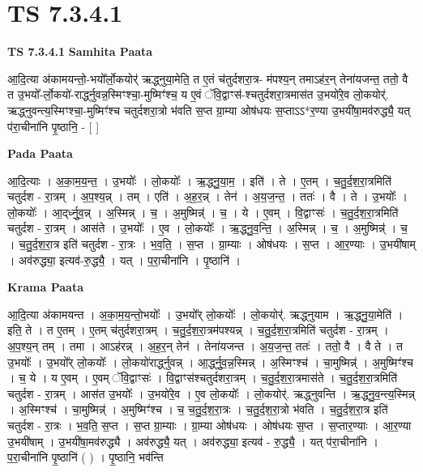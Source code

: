 \documentclass[17pt]{extarticle}
\begin{document}
\section{ TS 7.3.4.1 }

\textbf{TS 7.3.4.1 } \newline
\textbf{Samhita Paata} \newline

आ॒दि॒त्या अ॑कामयन्तो॒-भयो᳚र्लो॒कयोर्॑ ऋद्ध्नुया॒मेति॒ त ए॒तं च॑तुर्दशरा॒त्र- म॑पश्य॒न् तमाऽह॑र॒न् तेना॑यजन्त॒ ततो॒ वै त उ॒भयो᳚-र्लो॒कयो॑-रार्द्ध्नुवन्न॒स्मिꣳश्चा॒-मुष्मिꣳ॑श्च॒ य ए॒वं ॅवि॒द्वाꣳस॑-श्चतुर्दशरा॒त्रमास॑त उ॒भयो॑रे॒व लो॒कयोर्॑. ऋद्ध्नुवन्त्य॒स्मिꣳश्चा॒-मुष्मिꣳ॑श्च चतुर्दशरा॒त्रो भ॑वति स॒प्त ग्रा॒म्या ओष॑धयः स॒प्ताऽऽ*र॒ण्या उ॒भयी॑षा॒मव॑रुद्ध्यै॒ यत् प॑रा॒चीना॑नि पृ॒ष्ठानि॒ - [  ] \newline

\textbf{Pada Paata} \newline

आ॒दि॒त्याः । अ॒का॒म॒य॒न्त॒ । उ॒भयोः᳚ । लो॒कयोः᳚ । ऋ॒द्ध्नु॒या॒म॒ । इति॑ । ते । ए॒तम् । च॒तु॒र्द॒श॒रा॒त्रमिति॑ चतुर्दश - रा॒त्रम् । अ॒प॒श्य॒न्न् । तम् । एति॑ । अ॒ह॒र॒न्न् । तेन॑ । अ॒य॒ज॒न्त॒ । ततः॑ । वै । ते । उ॒भयोः᳚ । लो॒कयोः᳚ । आ॒द्‌र्ध्नु॒व॒न्न् । अ॒स्मिन्न् । च॒ । अ॒मुष्मिन्न्॑ । च॒ । ये । ए॒वम् । वि॒द्वाꣳसः॑ । च॒तु॒र्द॒श॒रा॒त्रमिति॑ चतुर्दश - रा॒त्रम् । आस॑ते । उ॒भयोः᳚ । ए॒व । लो॒कयोः᳚ । ऋ॒द्ध्नु॒व॒न्ति॒ । अ॒स्मिन्न् । च॒ । अ॒मुष्मिन्न्॑ । च॒ । च॒तु॒र्द॒श॒रा॒त्र इति॑ चतुर्दश - रा॒त्रः । भ॒व॒ति॒ । स॒प्त । ग्रा॒म्याः । ओष॑धयः । स॒प्त । आ॒र॒ण्याः । उ॒भयी॑षाम् । अव॑रुद्ध्या॒ इत्यव॑-रु॒द्ध्यै॒ । यत् । प॒रा॒चीना॑नि । पृ॒ष्ठानि॑ ।  \newline


\textbf{Krama Paata} \newline

आ॒दि॒त्या अ॑कामयन्त । अ॒का॒म॒य॒न्तो॒भयोः᳚ । उ॒भयो᳚र् लो॒कयोः᳚ । लो॒कयोर्॑. ऋद्ध्नुयाम । ऋ॒द्ध्नु॒या॒मेति॑ । इति॒ ते । त ए॒तम् । ए॒तम् च॑तुर्दशरा॒त्रम् । च॒तु॒र्द॒श॒रा॒त्रम॑पश्यन्न् । च॒तु॒र्द॒श॒रा॒त्रमिति॑ चतुर्दश - रा॒त्रम् । अ॒प॒श्य॒न् तम् । तमा । आऽह॑रन्न् । अ॒ह॒र॒न् तेन॑ । तेना॑यजन्त । अ॒य॒ज॒न्त॒ ततः॑ । ततो॒ वै । वै ते । त उ॒भयोः᳚ । उ॒भयो᳚र् लो॒कयोः᳚ । लो॒कयो॑रार्द्ध्नुवन्न् । आ॒र्द्ध्नु॒व॒न्न॒स्मिन्न् । अ॒स्मिꣳश्च॑ । चा॒मुष्मिन्न्॑ । अ॒मुष्मिꣳ॑श्च । च॒ ये । य ए॒वम् । ए॒वम् ॅवि॒द्वाꣳसः॑ । वि॒द्वाꣳस॑श्चतुर्दशरा॒त्रम् । च॒तु॒र्द॒श॒रा॒त्रमास॑ते । च॒तु॒र्द॒श॒रा॒त्रमिति॑ चतुर्दश - रा॒त्रम् । आस॑त उ॒भयोः᳚ । उ॒भयो॑रे॒व । ए॒व लो॒कयोः᳚ । लो॒कयोर्॑. ऋद्ध्नुवन्ति । ऋ॒द्ध्नु॒व॒न्त्य॒स्मिन्न् । अ॒स्मिꣳश्च॑ । चा॒मुष्मिन्न्॑ । अ॒मुष्मिꣳ॑श्च । च॒ च॒तु॒र्द॒श॒रा॒त्रः । च॒तु॒र्द॒श॒रा॒त्रो भ॑वति । च॒तु॒र्द॒श॒रा॒त्र इति॑ चतुर्दश - रा॒त्रः । भ॒व॒ति॒ स॒प्त । स॒प्त ग्रा॒म्याः । ग्रा॒म्या ओष॑धयः । ओष॑धयः स॒प्त । स॒प्तार॒ण्याः । आ॒र॒ण्या उ॒भयी॑षाम् । उ॒भयी॑षा॒मव॑रुद्ध्यै । अव॑रुद्ध्यै॒ यत् । अव॑रुद्ध्या॒ इत्यव॑ - रु॒द्ध्यै॒ । यत् प॑रा॒चीना॑नि । प॒रा॒चीना॑नि पृ॒ष्ठानि॑ ( ) । पृ॒ष्ठानि॒ भव॑न्ति \newline
\end{document}
